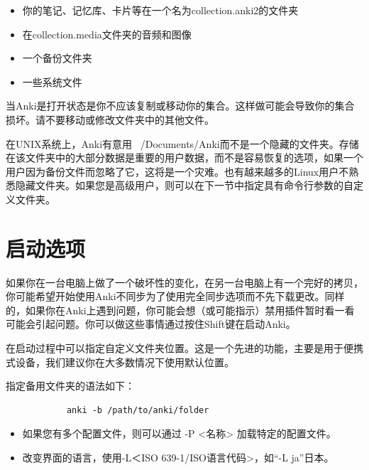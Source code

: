 \documentclass[a4paper]{book}
\begin{document}
		\begin{itemize}
			\itemsep1pt\parskip0pt
			\item 你的笔记、记忆库、卡片等在一个名为collection.anki2的文件夹
			\item 在collection.media文件夹的音频和图像
			\item 一个备份文件夹
			\item 一些系统文件
		\end{itemize}
		
		\begin{shaded}
			当Anki是打开状态是你不应该复制或移动你的集合。这样做可能会导致你的集合损坏。请不要移动或修改文件夹中的其他文件。
		\end{shaded}
		
		\begin{shaded}
			在UNIX系统上，Anki有意用~ /Documents/Anki而不是一个隐藏的文件夹。存储在该文件夹中的大部分数据是重要的用户数据，而不是容易恢复的选项，如果一个用户因为备份文件而忽略了它，这将是一个灾难。也有越来越多的Linux用户不熟悉隐藏文件夹。如果您是高级用户，则可以在下一节中指定具有命令行参数的自定义文件夹。
		\end{shaded}
		
		
		\section{启动选项}
		
		如果你在一台电脑上做了一个破坏性的变化，在另一台电脑上有一个完好的拷贝，你可能希望开始使用Anki不同步为了使用完全同步选项而不先下载更改。同样的，如果你在Anki上遇到问题，你可能会想（或可能指示）禁用插件暂时看一看可能会引起问题。你可以做这些事情通过按住Shift键在启动Anki。
		
		在启动过程中可以指定自定义文件夹位置。这是一个先进的功能，主要是用于便携式设备，我们建议你在大多数情况下使用默认位置。
		
		指定备用文件夹的语法如下：
		
		\begin{shaded}\begin{verbatim}
			anki -b /path/to/anki/folder
			\end{verbatim}\end{shaded}
		
		\begin{itemize}
			\itemsep1pt\parskip0pt
			\item 如果您有多个配置文件，则可以通过 -P <名称> 加载特定的配置文件。
			\item 改变界面的语言，使用-L＜ISO 639-1/ISO语言代码>，如“-L ja”日本。
		\end{itemize}
		
\end{document}
